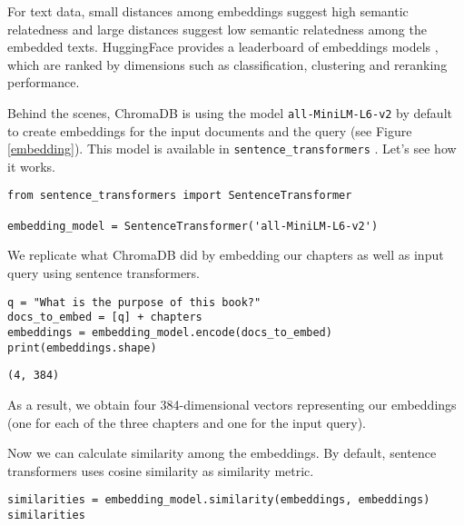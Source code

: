 For text data, small distances among embeddings suggest high semantic relatedness and large distances suggest low semantic relatedness among the embedded texts. HuggingFace provides a leaderboard of embeddings models , which are ranked by dimensions such as classification, clustering and reranking performance.

Behind the scenes, ChromaDB is using the model \texttt{all-MiniLM-L6-v2} by default  to create embeddings for the input documents and the query (see Figure \ref{embedding}). This model is available in \texttt{sentence\_transformers} . Let's see how it works.


\begin{verbatim}
from sentence_transformers import SentenceTransformer

embedding_model = SentenceTransformer('all-MiniLM-L6-v2')
\end{verbatim}

We replicate what ChromaDB did by embedding our chapters as well as input query using sentence transformers.

\begin{verbatim}
q = "What is the purpose of this book?"
docs_to_embed = [q] + chapters
embeddings = embedding_model.encode(docs_to_embed)
print(embeddings.shape)
\end{verbatim}

\begin{verbatim}
(4, 384)
\end{verbatim}

As a result, we obtain four 384-dimensional vectors representing our embeddings (one for each of the three chapters and one for the input query).

Now we can calculate similarity among the embeddings. By default, sentence transformers uses cosine similarity as similarity metric.

\begin{verbatim}
similarities = embedding_model.similarity(embeddings, embeddings)
similarities
\end{verbatim}

